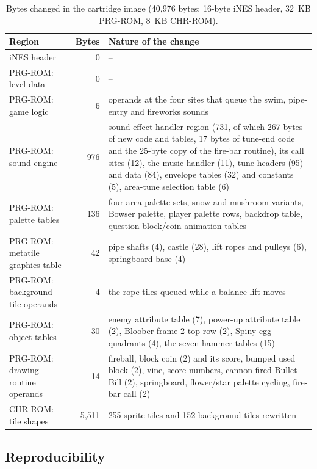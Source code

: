 \documentclass{article}
\begin{document}
\begin{table}[t]
  \caption{Bytes changed in the cartridge image (40{,}976 bytes: 16-byte iNES header, 32~KB
  PRG-ROM, 8~KB CHR-ROM).}
  \centering
  \small
  \begin{tabular}{lrp{8.6cm}}
    \toprule
    Region & Bytes & Nature of the change \\
    \midrule
    iNES header & 0 & -- \\
    PRG-ROM: level data & 0 & -- \\
    PRG-ROM: game logic & 6 & operands at the four sites that queue the swim, pipe-entry and fireworks sounds \\
    PRG-ROM: sound engine & 976 & sound-effect handler region (731, of which 267 bytes of new code and tables, 17 bytes of tune-end code and the 25-byte copy of the fire-bar routine), its call sites (12), the music handler (11), tune headers (95) and data (84), envelope tables (32) and constants (5), area-tune selection table (6) \\
    PRG-ROM: palette tables & 136 & four area palette sets, snow and mushroom variants, Bowser palette, player palette rows, backdrop table, question-block/coin animation tables \\
    PRG-ROM: metatile graphics table & 42 & pipe shafts (4), castle (28), lift ropes and pulleys (6), springboard base (4) \\
    PRG-ROM: background tile operands & 4 & the rope tiles queued while a balance lift moves \\
    PRG-ROM: object tables & 30 & enemy attribute table (7), power-up attribute table (2), Bloober frame 2 top row (2), Spiny egg quadrants (4), the seven hammer tables (15) \\
    PRG-ROM: drawing-routine operands & 14 & fireball, block coin (2) and its score, bumped used block (2), vine, score numbers, cannon-fired Bullet Bill (2), springboard, flower/star palette cycling, fire-bar call (2) \\
    CHR-ROM: tile shapes & 5{,}511 & 255 sprite tiles and 152 background tiles rewritten \\
    \bottomrule
  \end{tabular}
  \label{tab:changes}
\end{table}

\subsection{Reproducibility}
\label{sec:repro}
\end{document}
